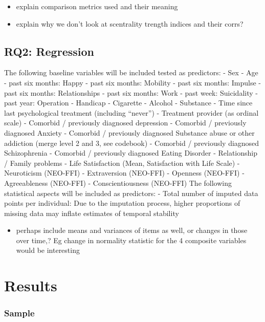 \documentclass[
  english,
  man]{apa6}
\providecommand{\tightlist}{%
  \setlength{\itemsep}{0pt}\setlength{\parskip}{0pt}}
\begin{document}
\begin{itemize}
\item
  explain comparison metrics used and their meaning
\item
  explain why we don't look at scentrality trength indices and their corrs?
\end{itemize}

\hypertarget{rq2-regression}{%
\subsection{RQ2: Regression}\label{rq2-regression}}

The following baseline variables will be included tested as predictors: - Sex - Age - past six months: Happy - past six months: Mobility - past six months: Impulse - past six months: Relationships - past six months: Work - past week: Suicidality - past year: Operation - Handicap - Cigarette - Alcohol - Substance - Time since last psychological treatment (including ``never'') - Treatment provider (as ordinal scale) - Comorbid / previously diagnosed depression - Comorbid / previously diagnosed Anxiety - Comorbid / previously diagnosed Substance abuse or other addiction (merge level 2 and 3, see codebook) - Comorbid / previously diagnosed Schizophrenia - Comorbid / previously diagnosed Eating Disorder - Relationship / Family problems - Life Satisfaction (Mean, Satisfaction with Life Scale) - Neuroticism (NEO-FFI) - Extraversion (NEO-FFI) - Openness (NEO-FFI) - Agreeableness (NEO-FFI) - Conscientiousness (NEO-FFI) The following statistical aspects will be included as predictors: - Total number of imputed data points per individual: Due to the imputation process, higher proportions of missing data may inflate estimates of temporal stability

\begin{itemize}
\tightlist
\item
  perhaps include means and variances of items as well, or changes in those over time,? Eg change in normality statistic for the 4 composite variables would be interesting
\end{itemize}

\hypertarget{results}{%
\section{Results}\label{results}}

\hypertarget{sample}{%
\subsubsection{Sample}\label{sample}}
\end{document}
